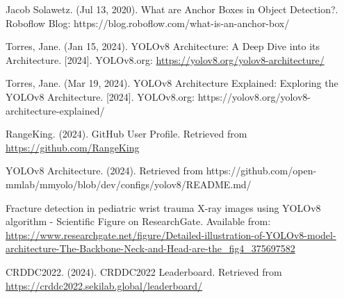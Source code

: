 \begin{thebibliography}{10}
        Jacob Solawetz. (Jul 13, 2020). What are Anchor Boxes in Object Detection?. Roboflow Blog: https://blog.roboflow.com/what-is-an-anchor-box/

        Torres, Jane. (Jan 15, 2024). YOLOv8 Architecture: A Deep Dive into its Architecture. [2024]. YOLOv8.org: \url{https://yolov8.org/yolov8-architecture/}

        Torres, Jane. (Mar 19, 2024). YOLOv8 Architecture Explained: Exploring the YOLOv8 Architecture. [2024]. YOLOv8.org: https://yolov8.org/yolov8-architecture-explained/
        
        RangeKing. (2024). GitHub User Profile.
        Retrieved from \url{https://github.com/RangeKing}

        YOLOv8 Architecture. (2024). Retrieved from https://github.com/open-mmlab/mmyolo/blob/dev/configs/yolov8/README.md/

        Fracture detection in pediatric wrist trauma X-ray images using YOLOv8 algorithm - Scientific Figure on ResearchGate. Available from: \url{https://www.researchgate.net/figure/Detailed-illustration-of-YOLOv8-model-architecture-The-Backbone-Neck-and-Head-are-the_fig4_375697582 }

        CRDDC2022. (2024). CRDDC2022 Leaderboard.
        Retrieved from \url{https://crddc2022.sekilab.global/leaderboard/}

  \end{thebibliography}
  